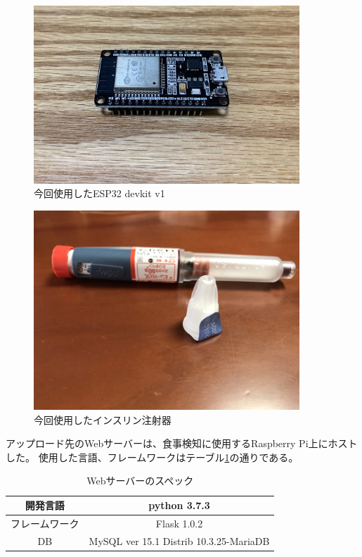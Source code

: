 \begin{figure}[htbp]
  \caption{今回使用したESP32 devkit v1}
  \label{fig:esp32}
  \begin{center}
    \includegraphics[bb=0 0 1300 1100,width=10cm]{assets/esp32.jpg}
  \end{center}
\end{figure}

\begin{figure}[htbp]
  \caption{今回使用したインスリン注射器}
  \label{fig:insulin_pen}
  \begin{center}
    \includegraphics[bb=0 0 1300 1200,width=10cm]{assets/insulin_pen_needle.jpg}
  \end{center}
\end{figure}


アップロード先のWebサーバーは、食事検知に使用するRaspberry Pi上にホストした。
使用した言語、フレームワークはテーブル\ref{tb:web_server}の通りである。

\begin{table}[htbp]
  \caption{Webサーバーのスペック}
  \label{tb:web_server}
  \begin{center}
    \begin{tabular}{|c||c|}
      \hline
      開発言語  & python 3.7.3 \\\hline
      フレームワーク  & Flask 1.0.2 \\\hline
      DB & MySQL ver 15.1 Distrib 10.3.25-MariaDB \\\hline
    \end{tabular}
  \end{center}
\end{table}

